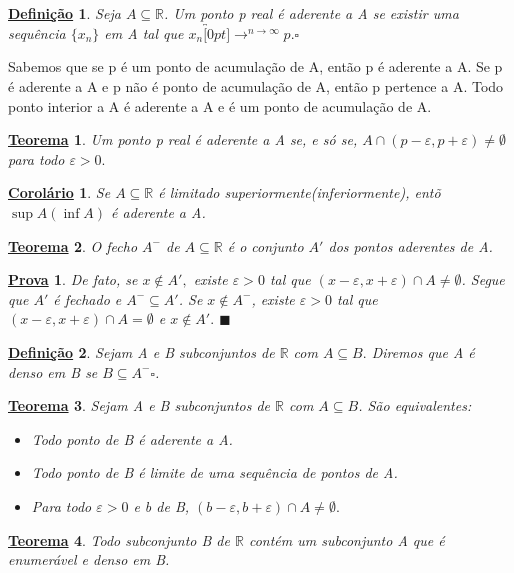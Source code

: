 \documentclass{article}
\newtheorem*{def*}{\underline{Defini\c c\~ao}}
\newtheorem*{theorem*}{\underline{Teorema}}
\newtheorem*{proof*}{\underline{Prova}}
\newtheorem*{crl*}{\underline{Corol\'ario}}
\renewcommand\qedsymbol{$\blacksquare$}
\begin{document}
 \begin{def*}
   Seja $A\subseteq{\mathbb{R}}$. Um ponto p real \'e aderente a A se existir uma sequ\^encia $\{x_{n}\}$ em A tal que $x_{n}\overbracket[0pt]{\longrightarrow}^{n\to \infty}p.\square$ 
 \end{def*}
  Sabemos que se p \'e um ponto de acumula\c c\~ao de A, ent\~ao p \'e aderente a A. Se p \'e aderente a A e p n\~ao \'e ponto de acumula\c c\~ao de A, ent\~ao
  p pertence a A. Todo ponto interior a A \'e aderente a A e \'e um ponto de acumula\c c\~ao de A.
 \begin{theorem*}
   Um ponto p real \'e aderente a A se, e s\'o se, $A\cap{(p-\varepsilon , p+\varepsilon )}\neq\emptyset$ para todo $\varepsilon  > 0.$
 \end{theorem*}
 \begin{crl*}
   Se $A\subseteq{\mathbb{R}}$ \'e limitado superiormente(inferiormente), ent\~o $\sup{A}(\inf{A})$ \'e aderente a A.
 \end{crl*}
\begin{theorem*}
  O fecho $A^{-}$ de $A\subseteq{\mathbb{R}}$ \'e o conjunto $A'$ dos pontos aderentes de A.
\end{theorem*}
\begin{proof*}
  De fato, se $x\not\in A',$ existe $\varepsilon >0$ tal que $(x-\varepsilon ,x+\varepsilon )\cap{A}\neq\emptyset$. Segue que
  $A'$ \'e fechado e $A^{-}\subseteq{A'}$. Se $x\not\in A^{-}$, existe $\varepsilon >0$ tal que $(x-\varepsilon ,x+\varepsilon )\cap{A}=\emptyset$
  e $x\not\in A'.$ \qedsymbol
\end{proof*}
\begin{def*}
  Sejam A e B subconjuntos de $\mathbb{R}$ com $A\subseteq{B}.$ Diremos que A \'e denso em B se $B\subseteq{A^{-}}\square$.
\end{def*}
\begin{theorem*}
  Sejam A e B subconjuntos de $\mathbb{R}$ com $A\subseteq{B}$. S\~ao equivalentes:
 \begin{itemize}
  \item Todo ponto de B \'e aderente a A.
  \item Todo ponto de B \'e limite de uma sequ\^encia de pontos de A.
  \item Para todo $\varepsilon >0$ e b de B, $(b-\varepsilon , b+\varepsilon )\cap{A}\neq\emptyset.$
 \end{itemize}
\end{theorem*}
\begin{theorem*}
  Todo subconjunto B de $\mathbb{R}$ cont\'em um subconjunto A que \'e enumer\'avel e denso em B.
\end{theorem*}
\end{document}
